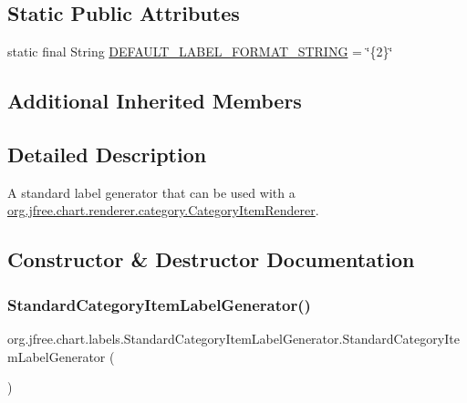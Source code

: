 \subsection*{Static Public Attributes}
\begin{DoxyCompactItemize}
\item 
static final String \mbox{\hyperlink{classorg_1_1jfree_1_1chart_1_1labels_1_1_standard_category_item_label_generator_a8589b49ecddebe86d89c5394b569b860}{D\+E\+F\+A\+U\+L\+T\+\_\+\+L\+A\+B\+E\+L\+\_\+\+F\+O\+R\+M\+A\+T\+\_\+\+S\+T\+R\+I\+NG}} = \char`\"{}\{2\}\char`\"{}
\end{DoxyCompactItemize}
\subsection*{Additional Inherited Members}


\subsection{Detailed Description}
A standard label generator that can be used with a \mbox{\hyperlink{interfaceorg_1_1jfree_1_1chart_1_1renderer_1_1category_1_1_category_item_renderer}{org.\+jfree.\+chart.\+renderer.\+category.\+Category\+Item\+Renderer}}. 

\subsection{Constructor \& Destructor Documentation}
\mbox{\label{classorg_1_1jfree_1_1chart_1_1labels_1_1_standard_category_item_label_generator_a8604de305c1f4a570eaf64b37ee8ecfb}} 
\subsubsection{\texorpdfstring{Standard\+Category\+Item\+Label\+Generator()}{StandardCategoryItemLabelGenerator()}\hspace{0.1cm}{\footnotesize\ttfamily [1/4]}}
{\footnotesize\ttfamily org.\+jfree.\+chart.\+labels.\+Standard\+Category\+Item\+Label\+Generator.\+Standard\+Category\+Item\+Label\+Generator (\begin{DoxyParamCaption}{ }\end{DoxyParamCaption})}

